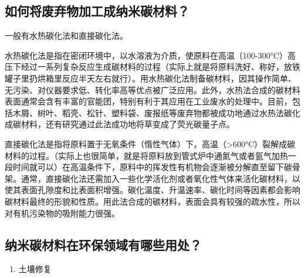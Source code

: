 \documentclass[
]{book}
\providecommand{\tightlist}{%
  \setlength{\itemsep}{0pt}\setlength{\parskip}{0pt}}
\begin{document}
\hypertarget{ux5982ux4f55ux5c06ux5e9fux5f03ux7269ux52a0ux5de5ux6210ux7eb3ux7c73ux78b3ux6750ux6599}{%
\subsection{如何将废弃物加工成纳米碳材料？}\label{ux5982ux4f55ux5c06ux5e9fux5f03ux7269ux52a0ux5de5ux6210ux7eb3ux7c73ux78b3ux6750ux6599}}

一般有水热碳化法和直接碳化法。

水热碳化法是指在密闭环境中，以水溶液为介质，使原料在高温（100-300°C）高压下经过一系列复杂反应生成碳材料的过程（实际上就是将原料洗好、称好，放铁罐子里扔烘箱里反应半天左右就行）。用水热碳化法制备碳材料，因其操作简单、无污染、对仪器要求低、转化率高等优点被广泛应用。此外，水热法合成的碳材料表面通常会含有丰富的官能团，特别有利于其应用在工业废水的处理中。目前，包括木屑、树叶、稻壳、松针、塑料袋、废报纸等废弃物都被成功地通过水热法碳化成碳材料，还有研究通过此法成功地将草变成了荧光碳量子点。

直接碳化法是指将原料置于无氧条件（惰性气体）下，高温（\textgreater600°C）裂解成碳材料的过程。（实际上也很简单，就是将原料放到管式炉中通氮气或者氩气加热一段时间就可以）在高温条件下，原料中的挥发性有机物会逐渐被分解直至留下碳骨架。通常，直接碳化法还需加入一些化学活化剂或者氧化性气体来活化碳材料，以使其表面孔隙度和比表面积增强。碳化温度、升温速率、碳化时间等因素都会影响碳材料最终的形貌和性质。用此法合成的碳材料，表面会具有较强的疏水性，所以对有机污染物的吸附能力很强。

\hypertarget{ux7eb3ux7c73ux78b3ux6750ux6599ux5728ux73afux4fddux9886ux57dfux6709ux54eaux4e9bux7528ux5904}{%
\subsection{纳米碳材料在环保领域有哪些用处？}\label{ux7eb3ux7c73ux78b3ux6750ux6599ux5728ux73afux4fddux9886ux57dfux6709ux54eaux4e9bux7528ux5904}}

\begin{enumerate}
\def\labelenumi{\arabic{enumi}.}
\tightlist
\item
  土壤修复
\end{enumerate}
\end{document}
